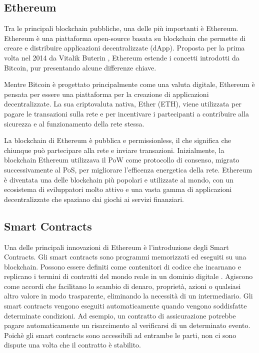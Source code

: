 \documentclass[../../Thesis.tex]{subfiles}
\begin{document}
\subsection{Ethereum}


Tra le principali blockchain pubbliche, una delle pi\`u importanti \`e Ethereum. Ethereum \`e una piattaforma open-source basata su blockchain che permette di creare e distribuire applicazioni decentralizzate (dApp). Proposta per la prima volta nel 2014 da Vitalik Buterin  \cite{Ethereum}, Ethereum estende i concetti introdotti da Bitcoin, pur presentando alcune differenze chiave.

Mentre Bitcoin \`e progettato principalmente come una valuta digitale, Ethereum \`e pensata per essere una piattaforma per la creazione di applicazioni decentralizzate. La sua criptovaluta nativa, Ether (ETH), viene utilizzata per pagare le transazioni sulla rete e per incentivare i partecipanti a contribuire alla sicurezza e al funzionamento della rete stessa.

La blockchain di Ethereum \`e pubblica e permissionless, il che significa che chiunque pu\`o partecipare alla rete e inviare transazioni. Inizialmente, la blockchain Ethereum utilizzava il PoW come protocollo di consenso, migrato successivamente al PoS, per migliorare l'efficenza energetica della rete. Ethereum \`e diventata una delle blockchain pi\`u popolari e utilizzate al mondo, con un ecosistema di sviluppatori molto attivo e una vasta gamma di applicazioni decentralizzate che spaziano dai giochi ai servizi finanziari.

\subsection{Smart Contracts}


Una delle principali innovazioni di Ethereum \`e l'introduzione degli Smart Contracts. Gli smart contracts sono programmi memorizzati ed eseguiti su una blockchain. Possono essere definiti come contenitori di codice che incarnano e replicano i termini di contratti del mondo reale in un dominio digitale \cite{SCReview}. Agiscono come accordi che facilitano lo scambio di denaro, propriet\`a, azioni o qualsiasi altro valore in modo trasparente, eliminando la necessit\`a di un intermediario. Gli smart contracts vengono eseguiti automaticamente quando vengono soddisfatte determinate condizioni. Ad esempio, un contratto di assicurazione potrebbe pagare automaticamente un risarcimento al verificarsi di un determinato evento. Poich\`e gli smart contracts sono accessibili ad entrambe le parti, non ci sono dispute una volta che il contratto \`e stabilito. 
\end{document}
